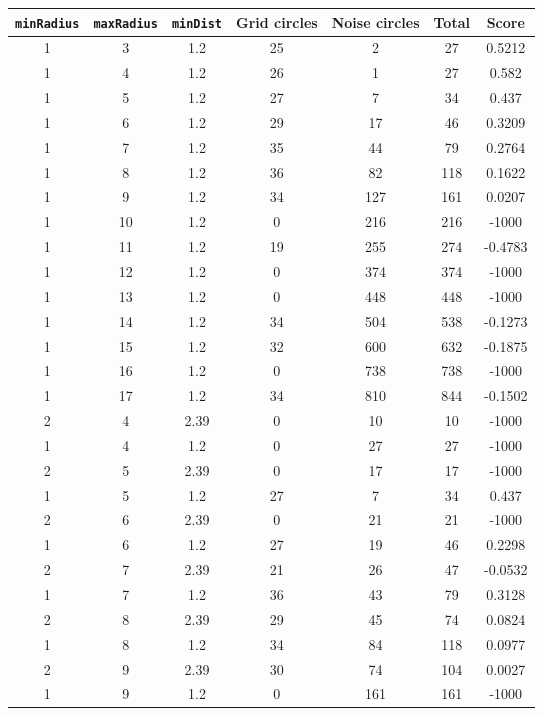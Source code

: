 \documentclass[letterpaper, 12pt]{article}
\begin{document}
\begin{longtable}{|c|c|c|c|c|c|c|}
\hline
\textbf{\texttt{minRadius}} & \textbf{\texttt{maxRadius}} & \textbf{\texttt{minDist}} & \textbf{Grid circles} & \textbf{Noise circles} & \textbf{Total} & \textbf{Score} \\
\hline
1 & 3 & 1.2 & 25 & 2 & 27 & 0.5212 \\
\hline
1 & 4 & 1.2 & 26 & 1 & 27 & 0.582 \\
\hline
1 & 5 & 1.2 & 27 & 7 & 34 & 0.437 \\
\hline
1 & 6 & 1.2 & 29 & 17 & 46 & 0.3209 \\
\hline
1 & 7 & 1.2 & 35 & 44 & 79 & 0.2764 \\
\hline
1 & 8 & 1.2 & 36 & 82 & 118 & 0.1622 \\
\hline
1 & 9 & 1.2 & 34 & 127 & 161 & 0.0207 \\
\hline
1 & 10 & 1.2 & 0 & 216 & 216 & -1000 \\
\hline
1 & 11 & 1.2 & 19 & 255 & 274 & -0.4783 \\
\hline
1 & 12 & 1.2 & 0 & 374 & 374 & -1000 \\
\hline
1 & 13 & 1.2 & 0 & 448 & 448 & -1000 \\
\hline
1 & 14 & 1.2 & 34 & 504 & 538 & -0.1273 \\
\hline
1 & 15 & 1.2 & 32 & 600 & 632 & -0.1875 \\
\hline
1 & 16 & 1.2 & 0 & 738 & 738 & -1000 \\
\hline
1 & 17 & 1.2 & 34 & 810 & 844 & -0.1502 \\
\hline
2 & 4 & 2.39 & 0 & 10 & 10 & -1000 \\
\hline
1 & 4 & 1.2 & 0 & 27 & 27 & -1000 \\
\hline
2 & 5 & 2.39 & 0 & 17 & 17 & -1000 \\
\hline
1 & 5 & 1.2 & 27 & 7 & 34 & 0.437 \\
\hline
2 & 6 & 2.39 & 0 & 21 & 21 & -1000 \\
\hline
1 & 6 & 1.2 & 27 & 19 & 46 & 0.2298 \\
\hline
2 & 7 & 2.39 & 21 & 26 & 47 & -0.0532 \\
\hline
1 & 7 & 1.2 & 36 & 43 & 79 & 0.3128 \\
\hline
2 & 8 & 2.39 & 29 & 45 & 74 & 0.0824 \\
\hline
1 & 8 & 1.2 & 34 & 84 & 118 & 0.0977 \\
\hline
2 & 9 & 2.39 & 30 & 74 & 104 & 0.0027 \\
\hline
1 & 9 & 1.2 & 0 & 161 & 161 & -1000 \\

\end{longtable}
\end{document}
